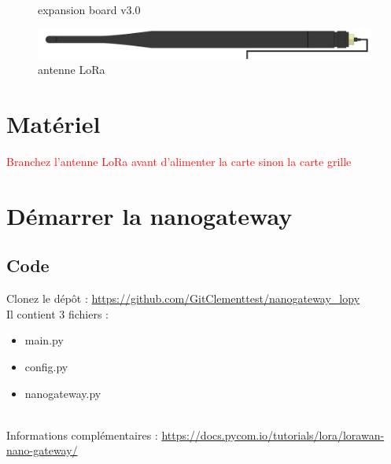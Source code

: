 \documentclass{article}
\begin{document}
\begin{figure}[H]
\begin{minipage}[b]{0.4\textwidth}
    \caption{expansion board v3.0}
  \end{minipage}
\end{figure}

    \begin{figure}[H]
\begin{center}
\advance\leftskip-3cm
\advance\rightskip-3cm
\includegraphics[keepaspectratio=true,scale=0.2]{lora_antenna.png}
\caption{antenne LoRa}
\label{visina8}
\end{center}\end{figure}



\section{Matériel}
\textcolor{red}{Branchez l'antenne LoRa avant d'alimenter la carte sinon la carte grille}\\

\section{Démarrer la nanogateway}
\subsection{Code}

Clonez le dépôt : \url{https://github.com/GitClementtest/nanogateway_lopy}\\
Il contient 3 fichiers :
\begin{itemize}
    \item main.py
    \item config.py
    \item nanogateway.py
\end{itemize}\\


Informations complémentaires : \url{https://docs.pycom.io/tutorials/lora/lorawan-nano-gateway/} 
\end{document}
